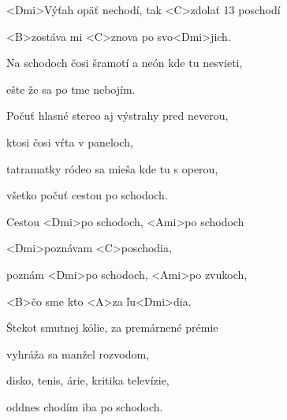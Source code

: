 

\zs
<Dmi>Výťah opäť nechodí, tak <C>zdolať 13 poschodí

<B>zostáva mi <C>znova po svo<Dmi>jich.

Na schodoch čosi šramotí a neón kde tu nesvieti,

ešte že sa po tme nebojím.
\ks

\zs
Počuť hlasné stereo aj výstrahy pred neverou,

ktosi čosi vŕta v paneloch,

tatramatky ródeo sa mieša kde tu s operou,

všetko počuť cestou po schodoch.
\ks

\zr
Cestou <Dmi>po schodoch, <Ami>po schodoch

<Dmi>poznávam <C>poschodia,

poznám <Dmi>po schodoch, <Ami>po zvukoch,

<B>čo sme kto <A>za ľu<Dmi>dia.
\kr

\zs
Štekot smutnej kólie, za premárnené prémie

vyhráža sa manžel rozvodom,

disko, tenis, árie, kritika televízie,

oddnes chodím iba po schodoch.
\ks

\zr \kr

\kp
